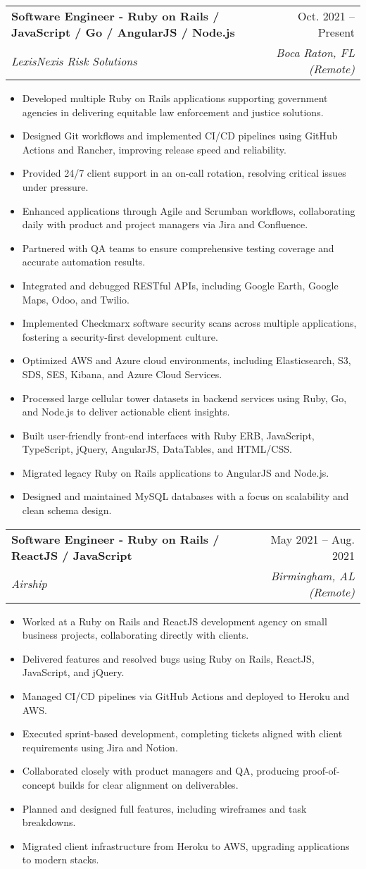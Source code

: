 \documentclass[letterpaper,11pt]{article}
\makeatletter
\newcommand{\resumeItem}[1]{
  \item\small{
    {#1 \vspace{-2pt}}
  }
}
\newcommand{\resumeSubheading}[4]{
  \vspace{-2pt}\item
    \begin{tabular*}{0.97\textwidth}[t]{l@{\extracolsep{\fill}}r}
      \textbf{#1} & #2 \\
      \textit{\small#3} & \textit{\small #4} \\
    \end{tabular*}\vspace{-7pt}
}
\newcommand{\resumeItemListStart}{\begin{itemize}}
\newcommand{\resumeItemListEnd}{\end{itemize}\vspace{-5pt}}
\makeatother
\begin{document}
\resumeSubheading
  {Software Engineer - Ruby on Rails / JavaScript / Go / AngularJS / Node.js}{Oct. 2021 -- Present}
  {LexisNexis Risk Solutions}{Boca Raton, FL (Remote)}
  \resumeItemListStart
    \resumeItem{Developed multiple Ruby on Rails applications supporting government agencies in delivering equitable law enforcement and justice solutions.}
    \resumeItem{Designed Git workflows and implemented CI/CD pipelines using GitHub Actions and Rancher, improving release speed and reliability.}
    \resumeItem{Provided 24/7 client support in an on-call rotation, resolving critical issues under pressure.}
    \resumeItem{Enhanced applications through Agile and Scrumban workflows, collaborating daily with product and project managers via Jira and Confluence.}
    \resumeItem{Partnered with QA teams to ensure comprehensive testing coverage and accurate automation results.}
    \resumeItem{Integrated and debugged RESTful APIs, including Google Earth, Google Maps, Odoo, and Twilio.}
    \resumeItem{Implemented Checkmarx software security scans across multiple applications, fostering a security-first development culture.}
    \resumeItem{Optimized AWS and Azure cloud environments, including Elasticsearch, S3, SDS, SES, Kibana, and Azure Cloud Services.}
    \resumeItem{Processed large cellular tower datasets in backend services using Ruby, Go, and Node.js to deliver actionable client insights.}
    \resumeItem{Built user-friendly front-end interfaces with Ruby ERB, JavaScript, TypeScript, jQuery, AngularJS, DataTables, and HTML/CSS.}
    \resumeItem{Migrated legacy Ruby on Rails applications to AngularJS and Node.js.}
    \resumeItem{Designed and maintained MySQL databases with a focus on scalability and clean schema design.}
  \resumeItemListEnd

\resumeSubheading
  {Software Engineer - Ruby on Rails / ReactJS / JavaScript}{May 2021 -- Aug. 2021}
  {Airship}{Birmingham, AL (Remote)}
  \resumeItemListStart
    \resumeItem{Worked at a Ruby on Rails and ReactJS development agency on small business projects, collaborating directly with clients.}
    \resumeItem{Delivered features and resolved bugs using Ruby on Rails, ReactJS, JavaScript, and jQuery.}
    \resumeItem{Managed CI/CD pipelines via GitHub Actions and deployed to Heroku and AWS.}
    \resumeItem{Executed sprint-based development, completing tickets aligned with client requirements using Jira and Notion.}
    \resumeItem{Collaborated closely with product managers and QA, producing proof-of-concept builds for clear alignment on deliverables.}
    \resumeItem{Planned and designed full features, including wireframes and task breakdowns.}
    \resumeItem{Migrated client infrastructure from Heroku to AWS, upgrading applications to modern stacks.}
  \resumeItemListEnd
\end{document}
